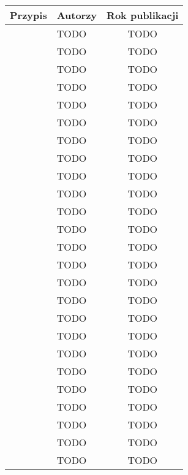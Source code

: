 \begin{table}[!ht]
    \centering
    \begin{tabular}{|c|l|c|}
    \hline
    \textbf{Przypis} & \textbf{Autorzy} & \textbf{Rok publikacji} \\
    \hline
    \cite{9284261} & TODO & TODO \\
    \hline
    \cite{9235063} & TODO & TODO \\
    \hline
    \cite{8567674} & TODO & TODO \\
    \hline
    \cite{pawlik2019performanceconsiderationsexecutionlarge} & TODO & TODO \\
    \hline
    \cite{10.1145/3631295.3631394} & TODO & TODO \\
    \hline
    \cite{10.1145/3491204.3543506} & TODO & TODO \\
    \hline
    \cite{9284261} & TODO & TODO \\
    \hline
    \cite{8605777} & TODO & TODO \\
    \hline
    \cite{EBRAHIMI2024103115} & TODO & TODO \\
    \hline
    \cite{8605773} & TODO & TODO \\
    \hline
    \cite{Cordingly2020704} & TODO & TODO \\
    \hline
    \cite{shrestha2019lambda} & TODO & TODO \\
    \hline
    \cite{8116416} & TODO & TODO \\
    \hline
    \cite{9860368} & TODO & TODO \\
    \hline
    \cite{8605779} & TODO & TODO \\
    \hline
    \cite{8844428} & TODO & TODO \\
    \hline
    \cite{FerreiraDosSantos2023} & TODO & TODO \\
    \hline
    \cite{10.1145/3458336.3465305} & TODO & TODO \\
    \hline
    \cite{ritzal2020optimizing} & TODO & TODO \\
    \hline
    \cite{menéndez2023performancebestpracticesusing} & TODO & TODO \\
    \hline
    \cite{9095731} & TODO & TODO \\
    \hline
    \cite{9912641} & TODO & TODO \\
    \hline
    \cite{8605774} & TODO & TODO \\
    \hline
    \cite{10.1145/3377812.3382135} & TODO & TODO \\
    \hline
    \cite{9732138} & TODO & TODO \\

\end{tabular}
\end{table}
